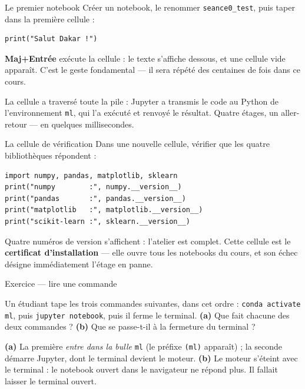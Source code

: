 \documentclass[aspectratio=169,11pt]{beamer}
\begin{document}
\begin{frame}[fragile]{Le premier notebook}
{\small Créer un notebook, le renommer \texttt{seance0\_test}, puis taper dans la première cellule :}
\begin{lstlisting}
print("Salut Dakar !")
\end{lstlisting}
{\small \textbf{Maj+Entrée} exécute la cellule : le texte s'affiche dessous, et une cellule vide apparaît. C'est le geste fondamental — il sera répété des centaines de fois dans ce cours.}
\begin{ucadex}
{\small La cellule a traversé toute la pile : Jupyter a transmis le code au Python de l'environnement \texttt{ml}, qui l'a exécuté et renvoyé le résultat. Quatre étages, un aller-retour — en quelques millisecondes.}
\end{ucadex}
\end{frame}

\begin{frame}[fragile]{La cellule de vérification}
{\small Dans une nouvelle cellule, vérifier que les quatre bibliothèques répondent :}
\begin{lstlisting}
import numpy, pandas, matplotlib, sklearn
print("numpy        :", numpy.__version__)
print("pandas       :", pandas.__version__)
print("matplotlib   :", matplotlib.__version__)
print("scikit-learn :", sklearn.__version__)
\end{lstlisting}
{\small Quatre numéros de version s'affichent : l'atelier est complet. Cette cellule est le \textbf{certificat d'installation} — elle ouvre tous les notebooks du cours, et son échec désigne immédiatement l'étage en panne.}
\end{frame}

\begin{frame}{Exercice — lire une commande}
\begin{ucadrec}[Énoncé]
{\small Un étudiant tape les trois commandes suivantes, dans cet ordre : \texttt{conda activate ml}, puis \texttt{jupyter notebook}, puis il ferme le terminal. \textbf{(a)} Que fait chacune des deux commandes ? \textbf{(b)} Que se passe-t-il à la fermeture du terminal ?}
\end{ucadrec}
\pause
\begin{ucadex}[Correction]
{\small \textbf{(a)} La première \emph{entre dans la bulle} \texttt{ml} (le préfixe \texttt{(ml)} apparaît) ; la seconde démarre Jupyter, dont le terminal devient le moteur. \textbf{(b)} Le moteur s'éteint avec le terminal : le notebook ouvert dans le navigateur ne répond plus. Il fallait laisser le terminal ouvert.}
\end{ucadex}
\end{frame}
\end{document}
